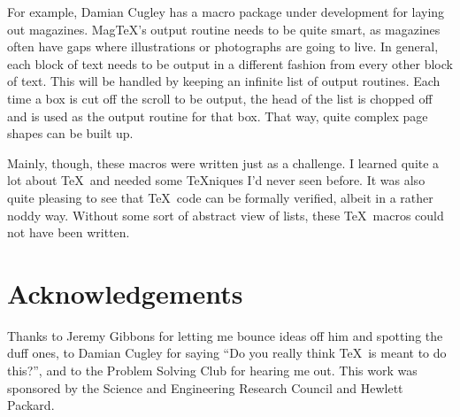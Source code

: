 For example, Damian Cugley has a macro package under development for
laying out magazines.  {\sc Mag}\TeX's output routine needs to be quite
smart, as magazines often have gaps where illustrations or photographs
are going to live.  In general, each block of text needs to be output
in a different fashion from every other block of text.
This will be handled by keeping an infinite list of output
routines.  Each time a box is cut off the scroll to be output,
the head of the list is chopped off and is used as the output routine
for that box.  That way, quite complex page shapes can be built up.

Mainly, though, these macros were written just as a challenge.
I learned quite a lot about \TeX\ and needed some \TeX niques I'd
never seen before.  It was also quite pleasing to see that \TeX\ code
can be formally verified, albeit in a rather noddy way.  Without
some sort of abstract view of lists, these \TeX\ macros could
not have been written.

\section{Acknowledgements}

Thanks to Jeremy Gibbons for letting me bounce ideas off him
and spotting the duff ones,
to Damian Cugley for saying ``Do you really think \TeX\ is meant
to do this?'', and to the Problem Solving Club for hearing me out.
This work was sponsored by the Science and Engineering
Research Council and Hewlett Packard.

\makesignature



